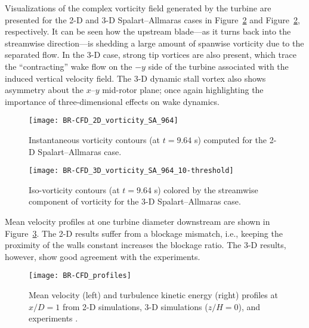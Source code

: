 Visualizations of the complex vorticity field generated by the turbine are
presented for the 2-D and 3-D Spalart--Allmaras cases in
Figure~\ref{fig:br-vorticity-3d} and Figure~\ref{fig:br-vorticity-3d},
respectively. It can be seen how the upstream blade---as it turns back into the
streamwise direction---is shedding a large amount of spanwise vorticity due to
the separated flow. In the 3-D case, strong tip vortices are also present, which
trace the ``contracting'' wake flow on the $-y$ side of the turbine associated
with the induced vertical velocity field. The 3-D dynamic stall vortex also
shows asymmetry about the $x$--$y$ mid-rotor plane; once again highlighting the
importance of three-dimensional effects on wake dynamics.

\begin{figure}
    \centering
    
    \texttt{[image: BR-CFD\_2D\_vorticity\_SA\_964]}

    \caption{Instantaneous vorticity contours (at $t=9.64$ s) computed for the
        2-D Spalart--Allmaras case.}

    \label{fig:br-vorticity-2d}
\end{figure}

\begin{figure}
    \centering

    \texttt{[image: BR-CFD\_3D\_vorticity\_SA\_964\_10-threshold]}

    \caption{Iso-vorticity contours (at $t=9.64$ s) colored by the streamwise
        component of vorticity for the 3-D Spalart--Allmaras case.}

    \label{fig:br-vorticity-3d}
\end{figure}

Mean velocity profiles at one turbine diameter downstream are shown in
Figure~\ref{fig:br-cfd-profiles}. The 2-D results suffer from a blockage
mismatch, i.e., keeping the proximity of the walls constant increases the
blockage ratio. The 3-D results, however, show good agreement with the
experiments.

\begin{figure}
    \centering

    \texttt{[image: BR-CFD\_profiles]}

    \caption{Mean velocity (left) and turbulence kinetic energy (right) profiles
        at $x/D=1$ from 2-D simulations, 3-D simulations ($z/H=0$), and experiments
        \cite{Bachant2015-JoT}.}

    \label{fig:br-cfd-profiles}
\end{figure}

